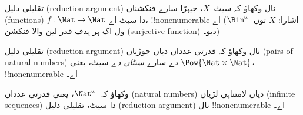 \documentclass[../../../include/open-logic-section]{subfiles}
\begin{document}

\begin{prob}\label{sfr:siz:red:prob:nat-nat}
  تقلیلی دلیل (reduction argument) نال وکھاؤ کہ سیٹ~$X$، جیہڑا سارے
  فنکشناں (functions) $f\colon \Nat \to \Nat$ دا سیٹ اے،
  !!{nonenumerable} اے (اشارا: $X$ توں~$\Bin^\omega$ ول اک ہر ہدف
  قدر لین والا فنکشن (surjective function) دیو۔)
\end{prob}

\begin{prob}
تقلیلی دلیل (reduction argument) نال وکھاؤ کہ قدرتی عدداں دیاں
جوڑیاں (pairs of natural numbers) دے سارے \emph{سیٹاں دے} سیٹ، یعنی
$\Pow{\Nat \times \Nat}$، !!{nonenumerable} اے۔
\end{prob}

\begin{prob}
وکھاؤ کہ~$\Nat^\omega$، یعنی قدرتی عدداں (natural numbers) دیاں
لامتناہی لڑیاں (infinite sequences) دا سیٹ، تقلیلی دلیل (reduction
argument) نال !!{nonenumerable} اے۔
\end{prob}

\end{document}
